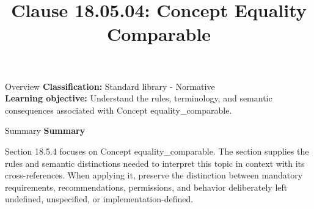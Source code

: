 \documentclass[10pt,letterpaper]{article}
\title{Clause 18.05.04: Concept Equality Comparable}
\author{}
\date{}
\begin{document}
\maketitle
\begin{CornellOverviewBox}{Overview}
\textbf{Classification:} Standard library - Normative\\[2pt]
\textbf{Learning objective:} Understand the rules, terminology, and semantic consequences associated with Concept equality\_comparable.
\end{CornellOverviewBox}\begin{CornellSummaryBox}{Summary}
{\sffamily\bfseries\color{Accent} Summary}\par\vspace{3pt}Section 18.5.4 focuses on Concept equality\_comparable. The section supplies the rules and semantic distinctions needed to interpret this topic in context with its cross-references. When applying it, preserve the distinction between mandatory requirements, recommendations, permissions, and behavior deliberately left undefined, unspecified, or implementation-defined.
\end{CornellSummaryBox}
\end{document}
